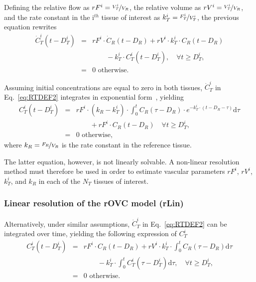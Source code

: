 Defining the relative flow as $rF^i = \nicefrac{V_T^i}{V_R}$, the relative volume as $rV^i = \nicefrac{V_T^i}{V_R}$, and the rate constant in the i$^{th}$ tissue of interest as $k_T^i = \nicefrac{F_T^i}{V_T^i}$, the previous equation rewrites
\begin{equation}
\begin{array}{rcl}
\dot{C}_T^i \left(t - D_T^i\right) &= & rF^i \cdot \dot{C}_{R}\left(t-D_R\right) + rV^i \cdot k_T^i \cdot C_{R} \left(t - D_{R}\right) \\
& & \qquad - k_T^i \cdot C_{T}^i \left( t - D_{T}^i \right), \quad \forall t \geq D_T^i,\\
&=& \textrm{0 otherwise.}
\end{array}
\label{eq:RTDEF2}
\end{equation}

Assuming initial concentrations are equal to zero in both tissues, $\dot{C}_T^i$ in Eq.~\ref{eq:RTDEF2} integrates in exponential form~\cite{Yankeelov2005de}, yielding
\begin{equation}
\begin{array}{rcl}
C_T^i \left( t - D_T^i \right) & = & rF^i \cdot \left( k_R - k_T^i \right) \cdot \int_{0}^{t} C_{R} \left( \tau - D_R \right) \cdot e^{- k_T^i \cdot \left( t - D_R - \tau \right)} \mathrm d \tau \\
& & \qquad + rF^i \cdot C_{R} \left( t - D_R \right) \quad \forall t \geq D_T^i, \\
&=& \textrm{0 otherwise,}
\end{array}
\label{eq:RTDEF4}
\end{equation}
where $k_R = \nicefrac{F_R}{V_R}$ is the rate constant in the reference tissue.

The latter equation, however, is not linearly solvable. 
A non-linear resolution method must therefore be used in order to estimate vascular parameters $rF^i$, $rV^i$, $k_T^i$, and $k_R$ in each of the $N_T$ tissues of interest.

\subsubsection{Linear resolution of the rOVC model (rLin)}
Alternatively, under similar assumptions, $\dot{C}_T^i$ in Eq.~\ref{eq:RTDEF2} can be integrated over time, yielding the following expression of $C_T^i$~\cite{CardenasRodriguez:2013em}
\begin{equation}
\begin{array}{rcl}
C_T^i \left(t - D_T^i\right) &=& rF^i \cdot C_{R}\left(t-D_R\right) + rV^i \cdot k_T^i \cdot \int_0^t C_{R} \left(\tau - D_{R}\right) \mathrm d\tau \\
& & \qquad - k_T^i \cdot \int_0^t C_{T}^i \left( \tau - D_{T}^i \right) \mathrm d\tau, \quad \forall t \geq D_T^i,\\
&=& \textrm{0 otherwise.}
\end{array}
\label{eq:RTDEF3}
\end{equation}

